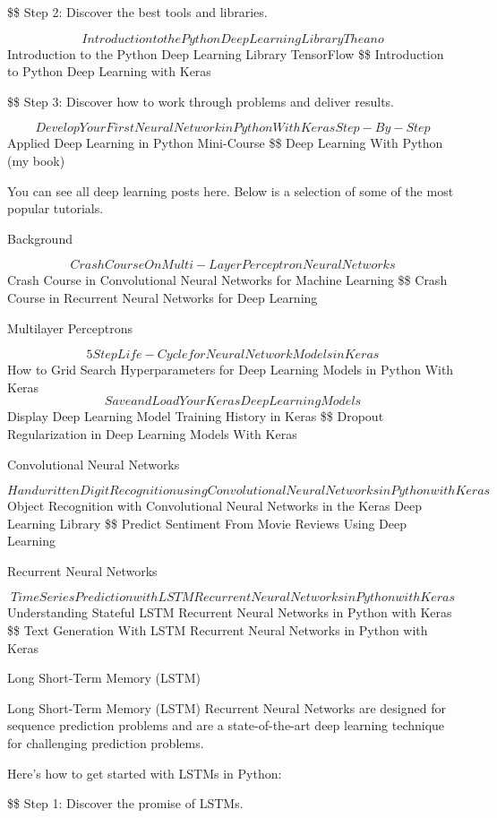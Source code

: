 \documentclass[11pt]{article}
\begin{document}
\$\$ Step 2: Discover the best tools and libraries. 

$$ Introduction to the Python Deep Learning Library Theano
 $$ Introduction to the Python Deep Learning Library TensorFlow
\$\$ Introduction to Python Deep Learning with Keras

\$\$ Step 3: Discover how to work through problems and deliver results. 

$$ Develop Your First Neural Network in Python With Keras Step-By-Step
 $$ Applied Deep Learning in Python Mini-Course
\$\$ Deep Learning With Python (my book)

You can see all deep learning posts here. Below is a selection of some of the most popular tutorials.

Background

$$ Crash Course On Multi-Layer Perceptron Neural Networks
$$ Crash Course in Convolutional Neural Networks for Machine Learning
\$\$ Crash Course in Recurrent Neural Networks for Deep Learning

Multilayer Perceptrons

$$ 5 Step Life-Cycle for Neural Network Models in Keras
$$ How to Grid Search Hyperparameters for Deep Learning Models in Python With Keras
$$ Save and Load Your Keras Deep Learning Models
$$ Display Deep Learning Model Training History in Keras
\$\$ Dropout Regularization in Deep Learning Models With Keras

Convolutional Neural Networks

$$ Handwritten Digit Recognition using Convolutional Neural Networks in Python with Keras
$$ Object Recognition with Convolutional Neural Networks in the Keras Deep Learning Library
\$\$ Predict Sentiment From Movie Reviews Using Deep Learning

Recurrent Neural Networks

$$ Time Series Prediction with LSTM Recurrent Neural Networks in Python with Keras
$$ Understanding Stateful LSTM Recurrent Neural Networks in Python with Keras
\$\$ Text Generation With LSTM Recurrent Neural Networks in Python with Keras

Long Short-Term Memory (LSTM)

Long Short-Term Memory (LSTM) Recurrent Neural Networks are designed for sequence prediction problems and are a state-of-the-art deep learning technique for challenging prediction problems.

Here’s how to get started with LSTMs in Python:

\$\$ Step 1: Discover the promise of LSTMs. 
\end{document}
